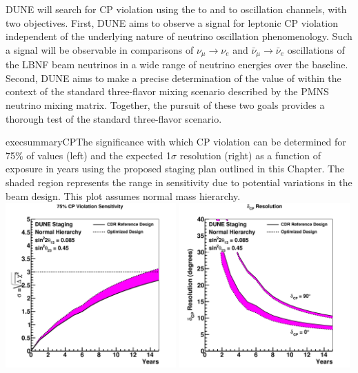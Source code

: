 DUNE will search for CP violation using the \numu to \nue and \anumu
to \anue oscillation channels, with two objectives.  First, DUNE aims
to observe a signal for leptonic CP violation independent of the
underlying nature of neutrino oscillation phenomenology. Such a signal
will be observable in comparisons of $\nu_\mu \rightarrow \nu_e$ and
$\bar{\nu}_{\mu} \rightarrow \bar{\nu}_e$ oscillations of the LBNF
beam neutrinos in a wide range of neutrino energies over the
 baseline.
Second,
DUNE aims to make a precise determination of the value of \deltacp
within the context of the standard three-flavor mixing scenario
described by the PMNS neutrino mixing matrix. Together, the pursuit of
these two goals provides a thorough test of the standard three-flavor
scenario.
%
\begin{cdrfigure}{execsummaryCP}{The
    significance with which CP violation can be determined for 75\% of
    \deltacp values (left) and the expected 1$\sigma$ resolution
    (right) as a function of exposure in years using the proposed
    staging plan outlined in this Chapter. The shaded region
    represents the range in sensitivity due to potential variations in
    the beam design. This plot assumes normal mass hierarchy.}
\includegraphics[width=0.49\textwidth]{volume-physics/figures/cpv75_exp_staging15yr}
 \includegraphics[width=0.49\textwidth]{volume-physics/figures/dcp_exp_staging.pdf}
\end{cdrfigure}
